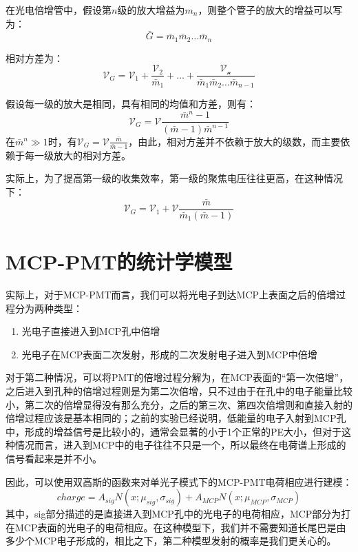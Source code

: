 \documentclass[a4paper]{article}
\begin{document}
在光电倍增管中，假设第$n$级的放大增益为$m_n$，则整个管子的放大的增益可以写为：
\begin{equation}
    \bar{G}=\bar{m}_1 \bar{m}_2 \ldots \bar{m}_n
\end{equation}

相对方差为：
\begin{equation}
    \mathscr{V}_G=\mathscr{V}{ }_1+\frac{\mathscr{V}_2}{\bar{m}_1}+\ldots+\frac{\mathscr{V_{ n }}}{\bar{m}_1 \bar{m}_2 \ldots \bar{m}_{n-1}}
\end{equation}

假设每一级的放大是相同，具有相同的均值和方差，则有：
\begin{equation}
    \mathscr{V}_G=\mathscr{V}\frac{\bar{m}^n-1}{(\bar{m}-1)\bar{m}^{n-1}}
\end{equation}
在$\bar{m}^n\gg 1$时，有$\mathscr{V}_G=\mathscr{V}\frac{\bar{m}}{\bar{m}-1}$，由此，相对方差并不依赖于放大的级数，而主要依赖于每一级放大的相对方差。

实际上，为了提高第一级的收集效率，第一级的聚焦电压往往更高，在这种情况下：
\begin{equation}
    \mathscr{V}_G=\mathscr{V}_1+\mathscr{V} \frac{\bar{m}}{\bar{m}_1(\bar{m}-1)}
\end{equation}
\section{MCP-PMT的统计学模型}
实际上，对于MCP-PMT而言，我们可以将光电子到达MCP上表面之后的倍增过程分为两种类型：
\begin{enumerate}
    \item {光电子直接进入到MCP孔中倍增}
    \item {光电子在MCP表面二次发射，形成的二次发射电子进入到MCP中倍增}
\end{enumerate}
对于第二种情况，可以将PMT的倍增过程分解为，在MCP表面的“第一次倍增”，之后进入到孔种的倍增过程则是为第二次倍增，只不过由于在孔中的电子能量比较小，第二次的倍增显得没有那么充分，之后的第三次、第四次倍增则和直接入射的倍增过程应该是基本相同的；之前的实验已经说明，低能量的电子入射到MCP孔中，形成的增益信号是比较小的，通常会显著的小于1个正常的PE大小，但对于这种情况而言，进入到MCP中的电子往往不只是一个，所以最终在电荷谱上形成的信号看起来是并不小。

因此，可以使用双高斯的函数来对单光子模式下的MCP-PMT电荷相应进行建模：
\begin{equation}
    charge = A_{sig}N(x;\mu_{sig},\sigma_{sig})+A_{MCP}N(x;\mu_{MCP},\sigma_{MCP})
\end{equation}
其中，sig部分描述的是直接进入到MCP孔中的光电子的电荷相应，MCP部分为打在MCP表面的光电子的电荷相应。在这种模型下，我们并不需要知道长尾巴是由多少个MCP电子形成的，相比之下，第二种模型发射的概率是我们更关心的。




\end{document}
